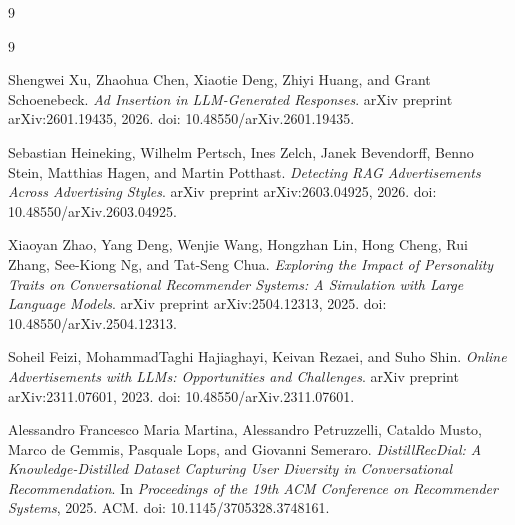 \documentclass{article}
\begin{document}
\begin{thebibliography}{9}
\begin{thebibliography}{9}

Shengwei Xu, Zhaohua Chen, Xiaotie Deng, Zhiyi Huang, and Grant Schoenebeck.
\textit{Ad Insertion in LLM-Generated Responses}.
arXiv preprint arXiv:2601.19435, 2026.
doi: 10.48550/arXiv.2601.19435.

Sebastian Heineking, Wilhelm Pertsch, Ines Zelch, Janek Bevendorff, Benno Stein, Matthias Hagen, and Martin Potthast.
\textit{Detecting RAG Advertisements Across Advertising Styles}.
arXiv preprint arXiv:2603.04925, 2026.
doi: 10.48550/arXiv.2603.04925.

Xiaoyan Zhao, Yang Deng, Wenjie Wang, Hongzhan Lin, Hong Cheng, Rui Zhang, See-Kiong Ng, and Tat-Seng Chua.
\textit{Exploring the Impact of Personality Traits on Conversational Recommender Systems: A Simulation with Large Language Models}.
arXiv preprint arXiv:2504.12313, 2025.
doi: 10.48550/arXiv.2504.12313.

Soheil Feizi, MohammadTaghi Hajiaghayi, Keivan Rezaei, and Suho Shin.
\textit{Online Advertisements with LLMs: Opportunities and Challenges}.
arXiv preprint arXiv:2311.07601, 2023.
doi: 10.48550/arXiv.2311.07601.

Alessandro Francesco Maria Martina, Alessandro Petruzzelli, Cataldo Musto, Marco de Gemmis, Pasquale Lops, and Giovanni Semeraro.
\textit{DistillRecDial: A Knowledge-Distilled Dataset Capturing User Diversity in Conversational Recommendation}.
In \textit{Proceedings of the 19th ACM Conference on Recommender Systems}, 2025.
ACM.
doi: 10.1145/3705328.3748161.

\end{thebibliography}

\end{thebibliography}
\end{document}
